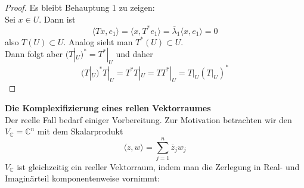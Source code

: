 \documentclass[12pt,a4paper]{article}
\theoremstyle{definition}
\theoremstyle{remark}
\renewcommand{\bar}[1]{\overline{#1}}
\begin{document}
\begin{proof}
		 Es bleibt Behauptung 1 zu zeigen: \\
		 Sei $x \in U$. Dann ist 
		 \begin{equation}
		 	\langle Tx,e_1 \rangle = \langle x, T^* e_1 \rangle = \bar{\lambda}_1 \langle x, e_1 \rangle = 0
		 \end{equation}
		 also $T(U) \subset U$. Analog sieht man $T^*(U) \subset U$. \\
		 Dann folgt aber $(T|_U)^* = T^*|_U$ und daher
		 \begin{equation}
		 	(T|_U)^*T|_U = T^*T|_U = TT^*|_U= T|_U(T|_U)^*
		 \end{equation}
	\end{proof}
	
	\newpage	
	
	\textbf{Die Komplexifizierung eines rellen Vektorraumes} \\
	Der reelle Fall bedarf einiger Vorbereitung. Zur Motivation betrachten wir den $V_{\mathbb{C}} = \mathbb{C}^n$ mit dem Skalarprodukt 
	\begin{equation}
		\langle z,w \rangle = \sum\limits_{j=1}^n \bar{z}_j w_j
	\end{equation}
	$V_{\mathbb{C}}$ ist gleichzeitig ein reeller Vektorraum, indem man die Zerlegung in Real- und Imaginärteil komponentenweise vornimmt: \\
\end{document}
